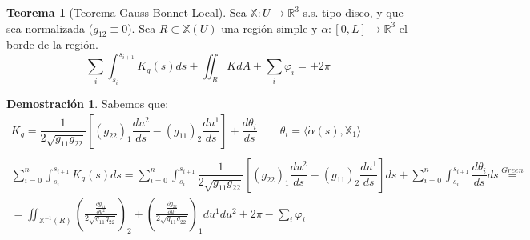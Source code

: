 \documentclass[twoside]{report}
\theoremstyle{definition}
\newtheorem{theorem}{Teorema}[section]
\newtheorem*{dem}{Demostración}
\numberwithin{equation}{section}
\newcommand{\R}{\mathbb{R}}
\newcommand{\X}{\mathbb{X}}
\newcommand{\seaX}{\X:U\rightarrow\R^3}
\begin{document}
\begin{theorem}[Teorema Gauss-Bonnet Local]\label{local}
Sea $\seaX$ s.s. tipo disco, y que sea normalizada ($g_{12} \equiv 0$). Sea $R\subset \X(U)$ una región simple y $\alpha:[0,L]\rightarrow\R^3$ el borde de la región.
\[
\sum_i \int_{s_i}^{s_{i+1}} K_g(s)ds + \iint_{R} KdA +  \sum_i \varphi_i  = \pm 2\pi
\]
\end{theorem}
\begin{dem}
Sabemos que:
\begin{gather*}
K_g = \dfrac{1}{2\sqrt{g_{11}g_{22}}}\left[(g_{22})_1\dfrac{du^2}{ds}-(g_{11})_2 \dfrac{du^1}{ds}\right]+\dfrac{d\theta_i}{ds} \qquad \theta_i = \langle\dot{\alpha}(s),\X_1\rangle \\ \\
\sum_{i=0}^n  \int_{s_i}^{s_{i+1}} K_g(s) ds = \sum_{i=0}^n  \int_{s_i}^{s_{i+1}} \dfrac{1}{2\sqrt{g_{11}g_{22}}}\left[(g_{22})_1\dfrac{du^2}{ds}-(g_{11})_2 \dfrac{du^1}{ds}\right]ds + \sum_{i=0}^n  \int_{s_i}^{s_{i+1}} \dfrac{d\theta_i}{ds} ds \overset{Green}{=}\\
= \iint_{\X^{-1}(R)} \left(\frac{\frac{\partial g_{11}}{\partial u^2}}{2\sqrt{g_{11}g_{22}}}\right)_2 + \left( \frac{\frac{\partial g_{22}}{\partial u^1}}{2\sqrt{g_{11}g_{22}}} \right)_1  du^1du^2 + 2\pi - \sum_i \varphi_i 
\end{gather*}
\end{dem}
\end{document}
